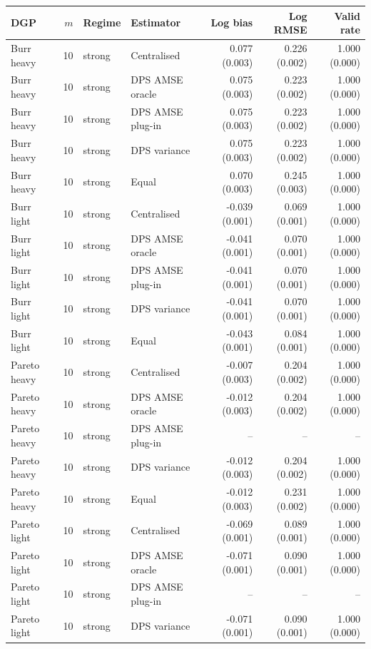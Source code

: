 \begin{tabular}{lrllrrr}
\toprule
DGP & $m$ & Regime & Estimator & Log bias & Log RMSE & Valid rate \\
\midrule
Burr heavy & 10 & strong & Centralised & 0.077 (0.003) & 0.226 (0.002) & 1.000 (0.000) \\
Burr heavy & 10 & strong & DPS AMSE oracle & 0.075 (0.003) & 0.223 (0.002) & 1.000 (0.000) \\
Burr heavy & 10 & strong & DPS AMSE plug-in & 0.075 (0.003) & 0.223 (0.002) & 1.000 (0.000) \\
Burr heavy & 10 & strong & DPS variance & 0.075 (0.003) & 0.223 (0.002) & 1.000 (0.000) \\
Burr heavy & 10 & strong & Equal & 0.070 (0.003) & 0.245 (0.003) & 1.000 (0.000) \\
Burr light & 10 & strong & Centralised & -0.039 (0.001) & 0.069 (0.001) & 1.000 (0.000) \\
Burr light & 10 & strong & DPS AMSE oracle & -0.041 (0.001) & 0.070 (0.001) & 1.000 (0.000) \\
Burr light & 10 & strong & DPS AMSE plug-in & -0.041 (0.001) & 0.070 (0.001) & 1.000 (0.000) \\
Burr light & 10 & strong & DPS variance & -0.041 (0.001) & 0.070 (0.001) & 1.000 (0.000) \\
Burr light & 10 & strong & Equal & -0.043 (0.001) & 0.084 (0.001) & 1.000 (0.000) \\
Pareto heavy & 10 & strong & Centralised & -0.007 (0.003) & 0.204 (0.002) & 1.000 (0.000) \\
Pareto heavy & 10 & strong & DPS AMSE oracle & -0.012 (0.003) & 0.204 (0.002) & 1.000 (0.000) \\
Pareto heavy & 10 & strong & DPS AMSE plug-in & -- & -- & -- \\
Pareto heavy & 10 & strong & DPS variance & -0.012 (0.003) & 0.204 (0.002) & 1.000 (0.000) \\
Pareto heavy & 10 & strong & Equal & -0.012 (0.003) & 0.231 (0.002) & 1.000 (0.000) \\
Pareto light & 10 & strong & Centralised & -0.069 (0.001) & 0.089 (0.001) & 1.000 (0.000) \\
Pareto light & 10 & strong & DPS AMSE oracle & -0.071 (0.001) & 0.090 (0.001) & 1.000 (0.000) \\
Pareto light & 10 & strong & DPS AMSE plug-in & -- & -- & -- \\
Pareto light & 10 & strong & DPS variance & -0.071 (0.001) & 0.090 (0.001) & 1.000 (0.000) \\

\end{tabular}
